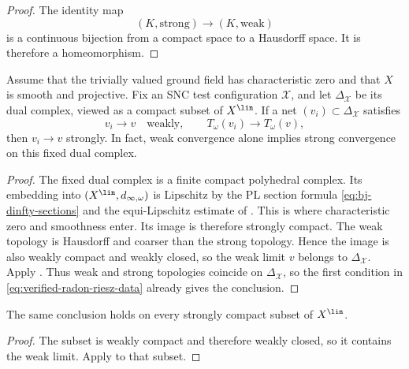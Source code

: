 \begin{proof}
The identity map
\[
     (K,\text{strong})\longrightarrow(K,\text{weak})
\tag{69.15}\label{eq:verified-identity-topologies}
\]
is a continuous bijection from a compact space to a Hausdorff space.
It is therefore a homeomorphism.
\end{proof}

\begin{theorem}\label{thm:verified-fixed-dual-complex}
Assume that the trivially valued ground field has characteristic zero and
that $X$ is smooth and projective. Fix an SNC test configuration
$\mathcal X$, and let
$\Delta_{\mathcal X}$ be its dual complex, viewed as a compact
subset of $X^{\lin}$. If a net
$(v_i)\subset\Delta_{\mathcal X}$ satisfies
\[
                        v_i\longrightarrow v
             \quad\text{weakly},
       \qquad
                        T_\omega(v_i)\longrightarrow T_\omega(v),
\tag{69.16}\label{eq:verified-radon-riesz-data}
\]
then $v_i\to v$ strongly. In fact, weak convergence alone implies
strong convergence on this fixed dual complex.
\end{theorem}

\begin{proof}
The fixed dual complex is a finite compact polyhedral complex.
Its embedding into $(X^{\lin},d_{\infty,\omega})$ is Lipschitz by
the PL section formula \eqref{eq:bj-dinfty-sections} and the equi-Lipschitz
estimate of \cite[Theorem~A.4]{BJ22}. This is where characteristic zero and
smoothness enter. Its image is therefore strongly compact. The weak topology
is Hausdorff and coarser than the strong topology. Hence the image is also
weakly compact and weakly closed, so the weak limit $v$ belongs to
$\Delta_{\mathcal X}$. Apply
. Thus weak and strong
topologies coincide on $\Delta_{\mathcal X}$, so the first condition
in \eqref{eq:verified-radon-riesz-data} already gives the conclusion.
\end{proof}

\begin{corollary}\label{cor:verified-strongly-compact}
The same conclusion holds on every strongly compact subset of
$X^{\lin}$.
\end{corollary}

\begin{proof}
The subset is weakly compact and therefore weakly closed, so it contains
the weak limit. Apply  to that subset.
\end{proof}

